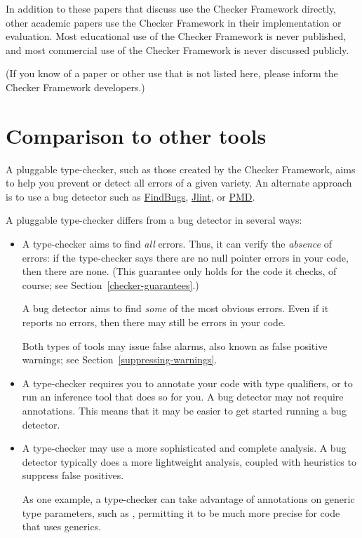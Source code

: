In addition to these papers that discuss use the Checker Framework
directly, other academic papers use the Checker Framework in their
implementation or evaluation.
Most educational use of the Checker
Framework is never published, and most commercial use of the Checker
Framework is never discussed publicly.

(If you know of a paper or other use that is not listed here, please inform the Checker
Framework developers.)


\section{Comparison to other tools\label{other-tools}}

A pluggable type-checker, such as those created by the Checker Framework,
aims to help you prevent or detect all errors of a given variety.  An
alternate approach is to use a bug detector such as
\href{http://findbugs.sourceforge.net/}{FindBugs},
\href{http://jlint.sourceforge.net/}{Jlint}, or
\href{http://pmd.sourceforge.net/}{PMD}.

A pluggable type-checker
differs from a bug detector in several ways:
\begin{itemize}
\item
  A type-checker aims to find \emph{all} errors.  Thus, it can verify the
  \emph{absence} of errors:  if the type-checker says there are no null
  pointer errors in your code, then there are none.  (This guarantee only
  holds for the code it checks, of course; see
  Section~\ref{checker-guarantees}.)

  A bug detector aims to find \emph{some} of the most obvious errors.  Even
  if it reports no errors, then there may still be errors in your code.

  Both types of tools may issue false alarms,
  also known as false positive warnings;
  see Section~\ref{suppressing-warnings}.

\item
  A type-checker requires you to annotate your code with type qualifiers,
  or to run an inference tool that does so for you.  A bug detector may not
  require annotations.  This means that it may be easier to get started
  running a bug detector.

\item
  A type-checker may use a more sophisticated and complete analysis.
  A bug detector typically does a more lightweight analysis, coupled with
  heuristics to suppress false positives.

  As one example, a type-checker can take advantage of annotations on
  generic type parameters, such as , permitting
  it to be much more precise for code that uses generics.

\end{itemize}

